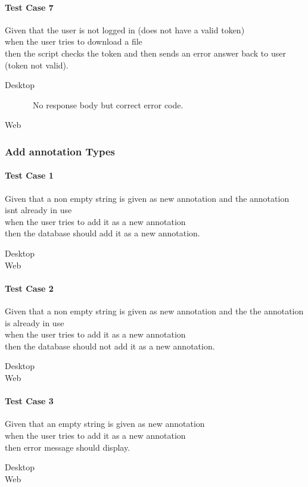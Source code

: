 \paragraph*{Test Case 7}
Given that the user is not logged in (does not have a valid token) \\ when the user tries to download a file \\ then the script checks the token and then sends an error answer back to user (token not valid).
\begin{description}
 \item[Desktop] \cmark\ No response body but correct error code.
 \item[Web]
\end{description}


\subsubsection{Add annotation Types}
\paragraph*{Test Case 1}
Given that a non empty string is given as new annotation and the annotation isnt already in use \\ when the user tries to add it as a new annotation \\ then the database should add it as a new annotation.
\begin{description}
 \item[Desktop]
 \item[Web] \cmark
\end{description}
\paragraph*{Test Case 2}
Given that a non empty string is given as new annotation and the the annotation is already in use \\ when the user tries to add it as a new annotation \\ then the database should not add it as a new annotation.
\begin{description}
 \item[Desktop]
 \item[Web] \cmark
\end{description}
\paragraph*{Test Case 3}
Given that an empty string is given as new annotation \\ when the user tries to add it as a new annotation \\ then error message should display.
\begin{description}
 \item[Desktop]
 \item[Web] \cmark
\end{description}


